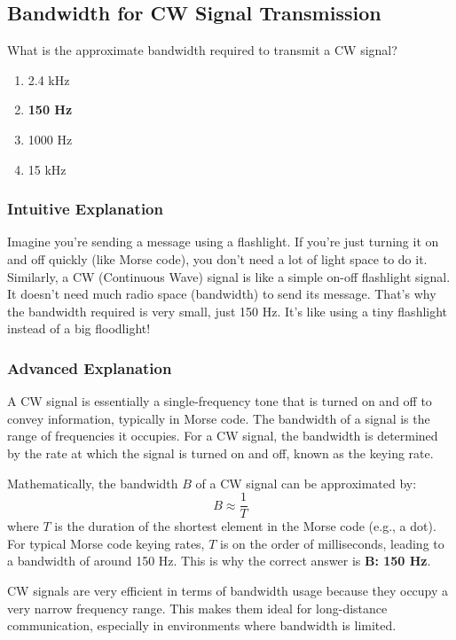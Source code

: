 \subsection{Bandwidth for CW Signal Transmission}
\label{T8A11}

\begin{tcolorbox}[colback=gray!10!white,colframe=black!75!black,title=T8A11]
What is the approximate bandwidth required to transmit a CW signal?
\begin{enumerate}[label=\Alph*]
    \item 2.4 kHz
    \item \textbf{150 Hz}
    \item 1000 Hz
    \item 15 kHz
\end{enumerate}
\end{tcolorbox}

\subsubsection{Intuitive Explanation}
Imagine you're sending a message using a flashlight. If you're just turning it on and off quickly (like Morse code), you don't need a lot of light space to do it. Similarly, a CW (Continuous Wave) signal is like a simple on-off flashlight signal. It doesn't need much radio space (bandwidth) to send its message. That's why the bandwidth required is very small, just 150 Hz. It's like using a tiny flashlight instead of a big floodlight!

\subsubsection{Advanced Explanation}
A CW signal is essentially a single-frequency tone that is turned on and off to convey information, typically in Morse code. The bandwidth of a signal is the range of frequencies it occupies. For a CW signal, the bandwidth is determined by the rate at which the signal is turned on and off, known as the keying rate. 

Mathematically, the bandwidth \( B \) of a CW signal can be approximated by:
\[
B \approx \frac{1}{T}
\]
where \( T \) is the duration of the shortest element in the Morse code (e.g., a dot). For typical Morse code keying rates, \( T \) is on the order of milliseconds, leading to a bandwidth of around 150 Hz. This is why the correct answer is \textbf{B: 150 Hz}.

CW signals are very efficient in terms of bandwidth usage because they occupy a very narrow frequency range. This makes them ideal for long-distance communication, especially in environments where bandwidth is limited.

